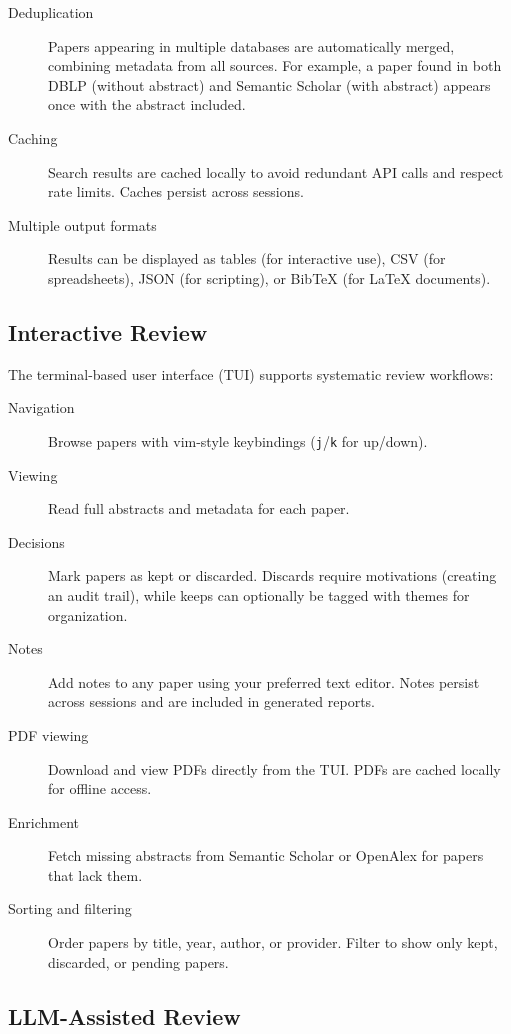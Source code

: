 \begin{description}
\item[Deduplication] Papers appearing in multiple databases are automatically 
  merged, combining metadata from all sources.
  For example, a paper found in both DBLP (without abstract) and Semantic 
  Scholar (with abstract) appears once with the abstract included.
\item[Caching] Search results are cached locally to avoid redundant API calls 
  and respect rate limits.
  Caches persist across sessions.
\item[Multiple output formats] Results can be displayed as tables (for 
  interactive use), CSV (for spreadsheets), JSON (for scripting), or BibTeX 
  (for \LaTeX{} documents).
\end{description}

\subsection{Interactive Review}

The terminal-based user interface (TUI) supports systematic review workflows:
\begin{description}
\item[Navigation] Browse papers with vim-style keybindings (\texttt{j}/\texttt{k} 
  for up/down).
\item[Viewing] Read full abstracts and metadata for each paper.
\item[Decisions] Mark papers as kept or discarded.
  Discards require motivations (creating an audit trail), while keeps can 
  optionally be tagged with themes for organization.
\item[Notes] Add notes to any paper using your preferred text editor.
  Notes persist across sessions and are included in generated reports.
\item[PDF viewing] Download and view PDFs directly from the TUI.
  PDFs are cached locally for offline access.
\item[Enrichment] Fetch missing abstracts from Semantic Scholar or OpenAlex 
  for papers that lack them.
\item[Sorting and filtering] Order papers by title, year, author, or provider.
  Filter to show only kept, discarded, or pending papers.
\end{description}

\subsection{LLM-Assisted Review}

